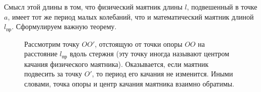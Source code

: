 \documentclass[12pt,a4paper]{scrartcl}
\begin{document}
	Смысл этой длины в том, что физический маятник длины $l$, подвешенный
	в точке $a$, имеет тот же период малых колебаний, что и математический
	маятник длиной $l_{\text{пр}}$. Сформулируем важную теорему.
	\begin{figure}[h]
		\begin{minipage}{0.7\linewidth}
			\begin{theorem}[Гюйгенса]
				Рассмотрим точку $OO'$, отстоящую от точки опоры $OO$ на расстояние $l_{\text{пр}}$ вдоль стержня (эту точку иногда называют центром качания физического маятника). Оказывается, если маятник подвесить за точку $O'$, то период его качания не изменится. Иными словами, точка опоры и центр качания маятника взаимно обратимы.
			\end{theorem}			
		\end{minipage}
		\begin{minipage}{0.3\linewidth}
			\begin{center}

\end{center}
\end{minipage}
\end{figure}
\end{document}
